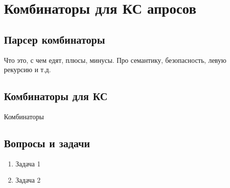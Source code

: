 \section{Комбинаторы для КС апросов}

\subsection{Парсер комбинаторы}

Что это, с чем едят, плюсы, минусы. Про семантику, безопасность, левую рекурсию и т.д.


\subsection{Комбинаторы для КС}
Комбинаторы~\cite{Verbitskaia:2018:PCC:3241653.3241655}


\subsection{Вопросы и задачи}
\begin{enumerate}
  \item Задача 1
  \item Задача 2
\end{enumerate}
